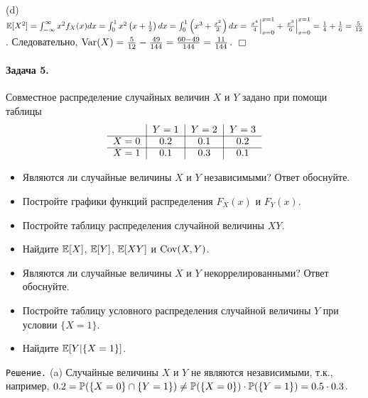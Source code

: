 \documentclass[12pt, a4paper]{article}\usepackage[]{graphicx}\usepackage[]{color}
\begin{document}
				(d) $\E[X^2] = \int_{-\infty}^{\infty}x^2f_X(x)dx = \int_{0}^{1}x^2\left(x+\tfrac{1}{2}\right)dx = \int_{0}^{1}\left(x^3+\tfrac{x^2}{2}\right)dx = \left.\tfrac{x^4}{4}\right|_{x=0}^{x=1} + \left.\tfrac{x^3}{6}\right|_{x=0}^{x=1} = \tfrac{1}{4} + \tfrac{1}{6} = \tfrac{5}{12}$.
				Следовательно, $\Var(X) = \tfrac{5}{12} - \tfrac{49}{144} = \tfrac{60-49}{144} = \tfrac{11}{144}$. $\Box$
				\paragraph{Задача 5.}
				Совместное распределение случайных величин $X$ и $Y$ задано при помощи таблицы
				\[
				\begin{tabular}{c|c|c|c}
				{}     & $Y=1$   & $Y=2$   & $Y=3$ \\ \cline{1-4}
				$X=0$  & $0.2$   & $0.1$   & $0.2$ \\ \cline{1-4}
				$X=1$  & $0.1$   & $0.3$   & $0.1$ \\
				\end{tabular}
				\]
				\begin{itemize}
					\item[(a)] Являются ли случайные величины $X$ и $Y$ независимыми? Ответ обоснуйте.
					\item[(b)] Постройте графики функций распределения $F_X(x)$ и $F_Y(x)$.
					\item[(c)] Постройте таблицу распределения случайной величины $XY$.
					\item[(d)] Найдите $\E[X]$, $\E[Y]$, $\E[XY]$ и $\Cov(X,Y)$.
					\item[(e)] Являются ли случайные величины $X$ и $Y$ некоррелированными? Ответ обоснуйте.
					\item[(f)] Постройте таблицу условного распределения случайной величины $Y$ при условии $\{X = 1\}$.
					\item[(g)] Найдите $\E[Y|\{X = 1\}]$.
				\end{itemize}

				\verb"Решение." (a) Случайные величины $X$ и $Y$ не являются независимыми, т.к., например, $0.2 = \P(\{X=0\} \cap \{Y=1\}) \not= \P(\{X=0\}) \cdot \P(\{Y=1\}) = 0.5 \cdot 0.3$.
\end{document}
